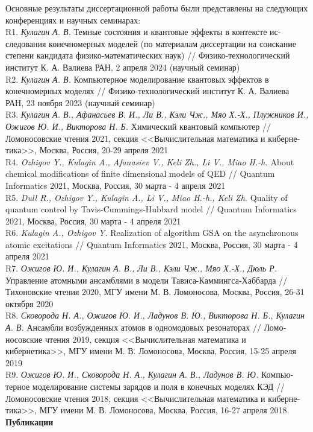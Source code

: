 Основные результаты диссертационной работы были представлены на следующих конференциях и научных семинарах:
\\[12pt]
R1. \textit{Кулагин А. В.} Темные состояния и квантовые эффекты в контексте ис­следования конечномерных моделей (по материалам диссертации на соискание степени кандидата физико-математических наук) // Физико-технологический институт К. А. Валиева РАН, 2 апреля 2024 (научный семинар)
\\[12pt]
R2. \textit{Кулагин А. В.} Компьютерное моделирование квантовых эффектов в конечномерных моделях // Физико-технологический институт К. А. Валиева РАН, 23 ноября 2023 (научный семинар)
\\[12pt]
R3. \textit{Кулагин А. В., Афанасьев В. И., Ли В., Кэли Чж., Мяо Х.-Х., Плужников И., Ожигов Ю. И., Викторова Н. Б.} Химический квантовый компьютер // Ломоносовские чтения 2021, секция <<Вычислительная математика и киберне­тика>>, Москва, Россия, 20-29 апреля 2021
\\[12pt]
R4. \textit{Ozhigov Y., Kulagin A., Afanasiev V., Keli Zh., Li V., Miao H.-h.} About chemical modifications of finite dimensional models of QED // Quantum Informatics 2021, Москва, Россия, 30 марта - 4 апреля 2021
\\[12pt]
R5. \textit{Dull R., Ozhigov Y., Kulagin A., Li V., Miao H.-h., Keli Zh.} Quality of quantum control by Tavis-Cummings-Hubbard model // Quantum Informatics 2021, Москва, Россия, 30 марта - 4 апреля 2021
\\[12pt]
R6. \textit{Kulagin A., Ozhigov Y.} Realization of algorithm GSA on the asynchronous atomic excitations // Quantum Informatics 2021, Москва, Россия, 30 марта - 4 апреля 2021
\\[12pt]
R7. \textit{Ожигов Ю. И., Кулагин А. В., Ли В., Кэли Чж., Мяо Х.-Х., Дюль Р.} Управление атомными ансамблями в модели Тависа-Каммингса-Хаббарда // Тихоновские чтения 2020, МГУ имени М. В. Ломоносова, Москва, Россия, 26-31 октября 2020
\\[12pt]
R8. \textit{Сковорода Н. А., Ожигов Ю. И., Ладунов В. Ю., Викторова Н. Б., Кулагин А. В.} Ансамбли возбужденных атомов в одномодовых резонаторах // Ломо­носовские чтения 2019, секция <<Вычислительная математика и кибернетика>>, МГУ имени М. В. Ломоносова, Москва, Россия, 15-25 апреля 2019
\\[12pt]
R9. \textit{Ожигов Ю. И., Сковорода Н. А., Кулагин А. В., Ладунов В. Ю.} Компью­терное моделирование системы зарядов и поля в конечных моделях КЭД // Ломоносовские чтения 2018, секция <<Вычислительная математика и киберне­тика>>, МГУ имени М. В. Ломоносова, Москва, Россия, 16-27 апреля 2018.
\
\\[18pt]
\indent\textbf{Публикации}

